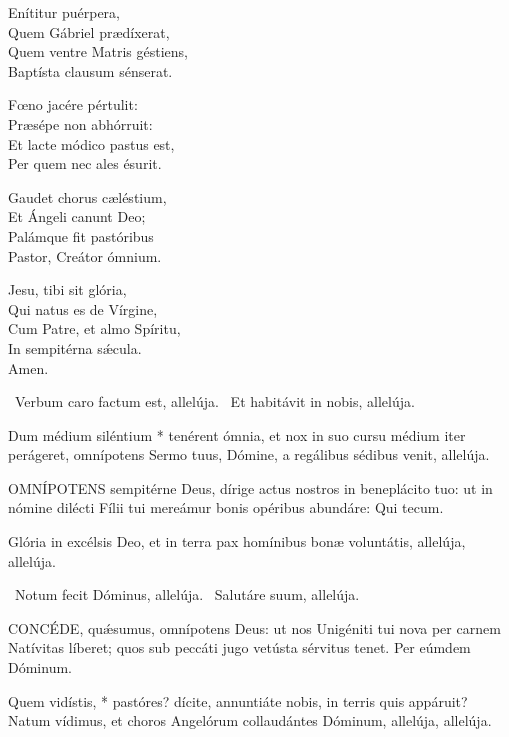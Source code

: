 Enítitur puérpera,\\
Quem Gábriel prædíxerat,\\
Quem ventre Matris géstiens,\\
Baptísta clausum sénserat.

Fœno jacére pértulit:\\
Præsépe non abhórruit:\\
Et lacte módico pastus est,\\
Per quem nec ales ésurit.

Gaudet chorus cæléstium,\\
Et Ángeli canunt Deo;\\
Palámque fit pastóribus\\
Pastor, Creátor ómnium.

Jesu, tibi sit glória,\\
Qui natus es de Vírgine,\\
Cum Patre, et almo Spíritu,\\
In sempitérna sǽcula.\\
Amen.

\V\ Verbum caro factum est, allelúja. \R\ Et habitávit in nobis, allelúja.

 Dum médium siléntium * tenérent ómnia, et nox in suo cursu médium iter perágeret, omnípotens Sermo tuus, Dómine, a regálibus sédibus venit, allelúja.


\lettrine[lines=2]{O}{MNÍPOTENS} sempitérne Deus, dírige actus nostros in beneplácito tuo: ut in nómine dilécti Fílii tui mereámur bonis opéribus abundáre: Qui tecum.


 Glória in excélsis Deo, et in terra pax homínibus bonæ voluntátis, allelúja, allelúja.

\V\ Notum fecit Dóminus, allelúja. \R\ Salutáre suum, allelúja.


\lettrine[lines=2]{C}{ONCÉDE}, quǽsumus, omnípotens Deus: ut nos Unigéniti tui nova per carnem Natívitas líberet; quos sub peccáti jugo vetústa sérvitus tenet. Per eúmdem Dóminum.


 Quem vidístis, * pastóres? dícite, annuntiáte nobis, in terris quis appáruit? Natum vídimus, et choros Angelórum collaudántes Dóminum, allelúja, allelúja.

